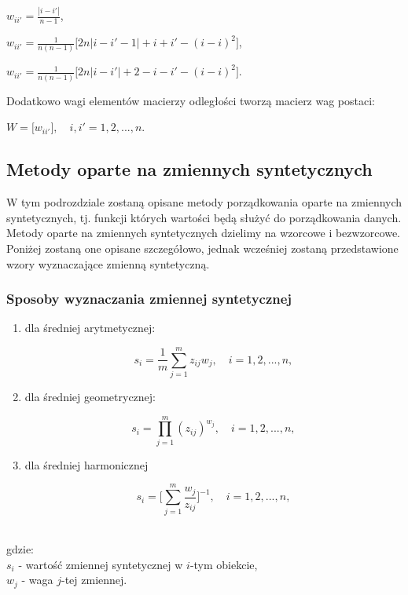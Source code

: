 \documentclass[12pt,a4paper]{report}
\begin{document}
 \begin{center}
 
 $ w_{ii'}=\frac{| i-i' |}{n-1}$, $\qquad$ \\
   \end{center}
   \begin{center}
 $ w_{ii'}=\frac{1}{n(n-1)}\lbrack{2n|i-i'-1|+i+i'-(i-i)^2\rbrack}$,\\
 \end{center}
 \begin{center}
 $ w_{ii'}=\frac{1}{n(n-1)}\lbrack{2n|i-i'|+2-i-i'-(i-i)^2\rbrack}$.\\
\end{center}

Dodatkowo wagi elementów macierzy odległości tworzą macierz wag postaci:

\begin{center}
$W=\lbrack{w_{ii'}\rbrack},\quad i,i'=1, 2, ..., n.$
\end{center}



\newpage
\subsection{Metody oparte na zmiennych syntetycznych}

W tym podrozdziale zostaną opisane metody porządkowania oparte na zmiennych syntetycznych, tj. funkcji których wartości będą służyć do porządkowania danych. Metody oparte na zmiennych syntetycznych dzielimy na wzorcowe i bezwzorcowe. Poniżej zostaną one opisane szczegółowo, jednak wcześniej zostaną przedstawione wzory wyznaczające zmienną syntetyczną. \\

\subsubsection{Sposoby wyznaczania zmiennej syntetycznej}

\begin{enumerate}
\item dla średniej arytmetycznej:
\begin{center}
$$s_{i}=\frac{1}{m} \sum_{j=1}^{m} z_{ij}w_{j},  \quad i=1, 2, ..., n,$$
\end{center}
\item dla średniej geometrycznej:
\begin{center}
$$s_{i}=\prod_{j=1}^{m} (z_{ij})^{w_{j}}, \quad i=1, 2, ..., n,$$
\end{center}
\item dla średniej harmonicznej
\begin{center}
$$s_{i}=\big[\sum_{j=1}^{m} \frac{w_{j}}{z_{ij}}\big]^{-1}, \quad i=1, 2, ..., n,$$\\
\end{center}
\end{enumerate}
gdzie:\\
$s_{i}$ - wartość zmiennej syntetycznej w $i$-tym obiekcie,\\
$w_{j}$ - waga $j$-tej zmiennej.
\end{document}
